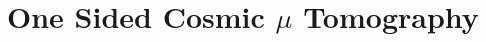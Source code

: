 \documentclass[12pt,a4paper]{article}
\begin{document}
\section{One Sided Cosmic $\mu$ Tomography}
\end{document}
